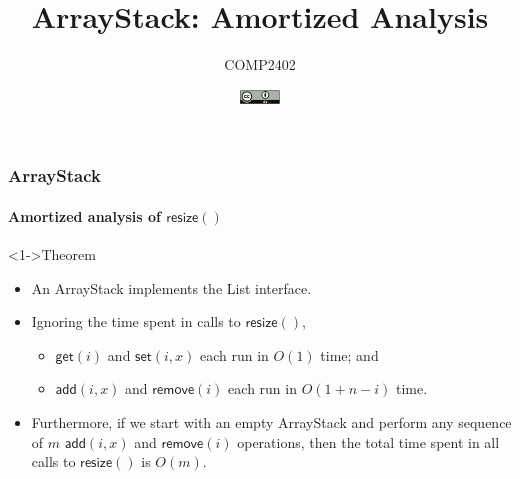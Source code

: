 \documentclass[aspectratio=169,xcolor=dvipsnames]{beamer}
\title{ArrayStack: Amortized Analysis}
\author{COMP2402}
\date{\includegraphics[height=1em]{by}}
\begin{document}
\begin{frame}
  \titlepage
\end{frame}

\begin{frame}
  \frametitle{ArrayStack}
  \framesubtitle{Amortized analysis of $\mathsf{resize}()$}
  \begin{block}<1->{Theorem}
    \begin{itemize}
      \item[]An ArrayStack implements the List interface.
      \item[]Ignoring the time spent in calls to $\mathsf{resize}()$,
      \begin{itemize}
          \item$\mathsf{get}(i)$ and $\mathsf{set}(i,x)$ each run in $O(1)$ time; and
          \item$\mathsf{add}(i,x)$ and $\mathsf{remove}(i)$ each run in $O(1+n-i)$ time.
      \end{itemize}
      \item<3->[]Furthermore, if we start with an empty ArrayStack and perform any sequence of $m$ $\mathsf{add}(i,x)$ and $\mathsf{remove}(i)$ operations, then the total time spent in all calls to $\mathsf{resize}()$ is $O(m)$.
    \end{itemize}
  \end{block}
\end{frame}

\newlength{\nwidth}
\setlength{\fboxsep}{0pt}
\setlength{\nwidth}{.25\textwidth}
\end{document}
